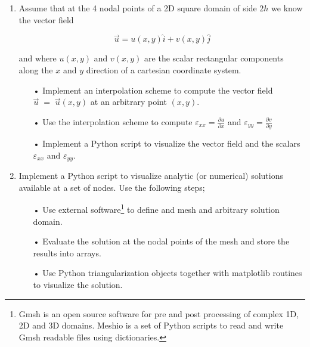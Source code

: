 \begin{enumerate}
\item \label{punto 08} Assume that at the 4 nodal points of a 2D square domain of side $2h$ we know the vector field

\[\overrightarrow u=u(x,y)\widehat i+v(x,y)\widehat j \]

and where $u(x,y)$ and $v(x,y)$ are the scalar rectangular components along the $x$ and $y$ direction of a cartesian coordinate system.

\begin{itemize}
\item[•] Implement an interpolation scheme to compute the vector field $\overrightarrow u\;=\;\overrightarrow u(x,y)$ at an arbitrary point $(x,y)$.
\item[•] Use the interpolation scheme to compute $\varepsilon_{xx}=\frac{\partial u}{\partial x}$ and $\varepsilon_{yy}=\frac{\partial v}{\partial y}$
\item[•] Implement a Python script to visualize the vector field and the scalars $\varepsilon_{xx}$ and $\varepsilon_{yy}$.
\end{itemize}

\item \label{punto 09}
Implement a Python script to visualize analytic (or numerical) solutions available at a set of nodes. Use the following steps;

\begin{itemize}
\item[•] Use external software\footnote{Gmsh is an open source software for pre and post processing of complex 1D, 2D and 3D domains. Meshio is a set of Python scripts to read and write Gmsh readable files using dictionaries.} to define and mesh and arbitrary solution domain.
\item[•] Evaluate the solution at the nodal points of the mesh and store the results into arrays.
\item[•] Use Python triangularization objects together with matplotlib routines to visualize the solution.
\end{itemize}


\end{enumerate}
